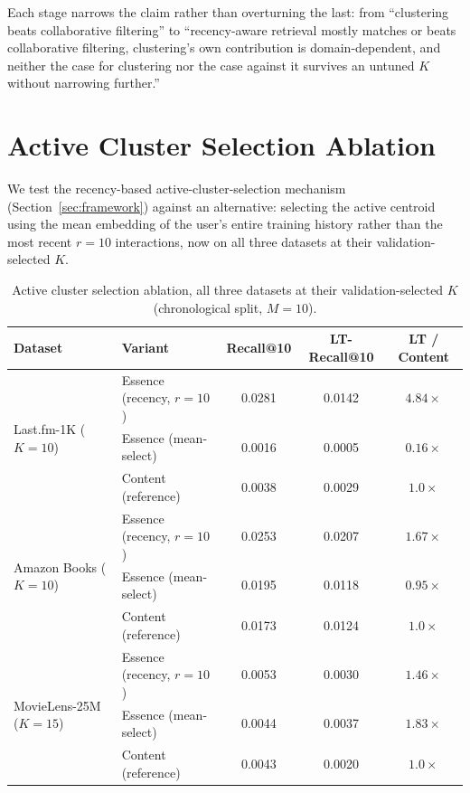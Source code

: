 \documentclass{article}
\begin{document}
Each stage narrows the claim rather than overturning the last: from ``clustering beats collaborative filtering'' to ``recency-aware retrieval mostly matches or beats collaborative filtering, clustering's own contribution is domain-dependent, and neither the case for clustering nor the case against it survives an untuned $K$ without narrowing further.''

\section{Active Cluster Selection Ablation}
\label{app:ablation}

We test the recency-based active-cluster-selection mechanism (Section~\ref{sec:framework}) against an alternative: selecting the active centroid using the mean embedding of the user's entire training history rather than the most recent $r=10$ interactions, now on all three datasets at their validation-selected $K$.

\begin{table}[H]
\centering
\caption{Active cluster selection ablation, all three datasets at their validation-selected $K$ (chronological split, $M=10$).}
\label{tab:ablation}
\small
\begin{tabular}{llccc}
\toprule
\textbf{Dataset} & \textbf{Variant} & \textbf{Recall@10} & \textbf{LT-Recall@10} & \textbf{LT / Content} \\
\midrule
\multirow{3}{*}{Last.fm-1K ($K{=}10$)}
 & Essence (recency, $r{=}10$) & 0.0281 & 0.0142 & $4.84\times$ \\
 & Essence (mean-select) & 0.0016 & 0.0005 & $0.16\times$ \\
 & Content (reference) & 0.0038 & 0.0029 & $1.0\times$ \\
\midrule
\multirow{3}{*}{Amazon Books ($K{=}10$)}
 & Essence (recency, $r{=}10$) & 0.0253 & 0.0207 & $1.67\times$ \\
 & Essence (mean-select) & 0.0195 & 0.0118 & $0.95\times$ \\
 & Content (reference) & 0.0173 & 0.0124 & $1.0\times$ \\
\midrule
\multirow{3}{*}{MovieLens-25M ($K{=}15$)}
 & Essence (recency, $r{=}10$) & 0.0053 & 0.0030 & $1.46\times$ \\
 & Essence (mean-select) & 0.0044 & 0.0037 & $1.83\times$ \\
 & Content (reference) & 0.0043 & 0.0020 & $1.0\times$ \\
\bottomrule
\end{tabular}
\end{table}
\end{document}
